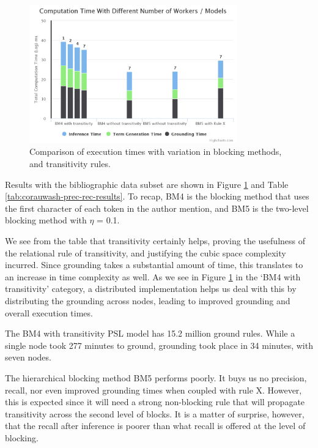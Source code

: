 \documentclass{article}
\begin{document}
        \begin{figure}
                \centering
                \includegraphics[width=0.80\textwidth]{images/CoraUWashResults-HighLevel.png}
                \caption{Comparison of execution times with variation in blocking methods, and transitivity rules.}
                \label{fig:corauwash-results}
            \end{figure}

        Results with the bibliographic data subset are shown in Figure \ref{fig:corauwash-results} and Table \ref{tab:corauwash-prec-rec-results}. To recap, BM4 is the blocking method that uses the first character of each token in the author mention, and BM5 is the two-level blocking method with $\eta$ = 0.1.
        
        We see from the table that transitivity certainly helps, proving the usefulness of the relational rule of transitivity, and justifying the cubic space complexity incurred. Since grounding takes a substantial amount of time, this translates to an increase in time complexity as well. As we see in Figure \ref{fig:corauwash-results} in the `BM4 with transitivity' category, a distributed implementation helps us deal with this by distributing the grounding across nodes, leading to improved grounding and overall execution times. 
        
        The BM4 with transitivity PSL model has 15.2 million ground rules. While a single node took 277 minutes to ground, grounding took place in 34 minutes, with seven nodes. 
        
        The hierarchical blocking method BM5 performs poorly. It buys us no precision, recall, nor even improved grounding times when coupled with rule X. However, this is expected since it will need a strong non-blocking rule that will propagate transitivity across the second level of blocks. It is a matter of surprise, however, that the recall after inference is poorer than what recall is offered at the level of blocking.
        
\end{document}
